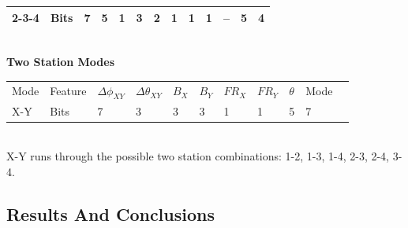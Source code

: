 \begin{table}[htb]
\begin{tabular}{ l  l  l  l  l  l  l  l  l  l  l  l  l}
   2-3-4 & Bits & 7 & 5 & 1 & 3 & 2 & 1 & 1 & 1 & -- & 5 & 4 \\ 
   \hline
   \end{tabular}
\\[\baselineskip]
   \textbf{Two Station Modes}
\\[\baselineskip]
   \begin{tabular}{ l  l  l  l  l  l  l  l  l  l  l }
   \hline
   Mode & Feature & $\Delta\phi_{XY}$ & $\Delta\theta_{XY}$ & $B_X$ & $B_Y$ & $FR_X$ & $FR_Y$ & $\theta$ & Mode \\ \cline{2-10}
   X-Y & Bits & 7 & 3 & 3 & 3 & 1 & 1 & 5 & 7 \\ \hline

%   
%   
%   
%   
   \end{tabular}
\\[\baselineskip]
X-Y runs through the possible two station combinations: 1-2, 1-3, 1-4, 2-3, 2-4, 3-4.
\end{table}

\subsection{Results And Conclusions}

